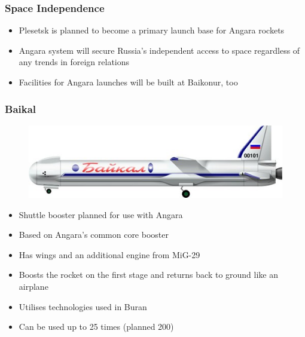 \documentclass[onlymath]{beamer}
\begin{document}
\begin{frame}
  \frametitle{Space Independence}
  \begin{itemize}
  \item Plesetsk is planned to become a primary launch base for Angara
    rockets
  \item Angara system will secure Russia's independent access to space
    regardless of any trends in foreign relations
  \item Facilities for Angara launches will be built at Baikonur, too
  \end{itemize}
\end{frame}

\begin{frame}
  \frametitle{Baikal}
  \begin{figure}
    \centering
    \includegraphics[scale=0.5]{Baikal.jpg}
  \end{figure}
  \begin{itemize}
  \item Shuttle booster planned for use with Angara
  \item Based on Angara's common core booster
  \item Has wings and an additional engine from MiG-29
  \item Boosts the rocket on the first stage and returns back to
    ground like an airplane
  \item Utilises technologies used in Buran
  \item Can be used up to 25 times (planned 200)
  \end{itemize}
\end{frame}
\end{document}
